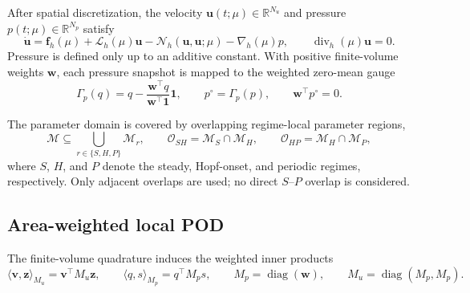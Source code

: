 \documentclass{article}
\begin{document}
After spatial discretization, the velocity
$\bm u(t;\mu)\in\mathbb R^{N_u}$ and pressure
$p(t;\mu)\in\mathbb R^{N_p}$ satisfy
\begin{equation}
    \dot{\bm u}
    =
    \bm f_h(\mu)
    +\mathcal L_h(\mu)\bm u
    -\mathcal N_h(\bm u,\bm u;\mu)
    -\nabla_h(\mu)p,
    \qquad
    \operatorname{div}_h(\mu)\bm u=0.
    \label{eq:app_fom}
\end{equation}
Pressure is defined only up to an additive constant.
With positive finite-volume weights $\bm w$, each pressure snapshot is mapped
to the weighted zero-mean gauge
\begin{equation}
    \Gamma_p(q)
    =
    q-\frac{\bm w^\top q}{\bm w^\top\bm 1}\bm 1,
    \qquad
    p^\circ=\Gamma_p(p),
    \qquad
    \bm w^\top p^\circ=0.
    \label{eq:app_pressure_gauge}
\end{equation}

The parameter domain is covered by overlapping regime-local parameter regions,
\begin{equation}
    \mathcal M
    \subseteq
    \bigcup_{r\in\{S,H,P\}}\mathcal M_r,
    \qquad
    \mathcal O_{SH}
    =
    \mathcal M_S\cap\mathcal M_H,
    \qquad
    \mathcal O_{HP}
    =
    \mathcal M_H\cap\mathcal M_P,
    \label{eq:app_regime_cover}
\end{equation}
where $S$, $H$, and $P$ denote the steady, Hopf-onset, and periodic
regimes, respectively.
Only adjacent overlaps are used; no direct $S$--$P$ overlap is considered.


\subsection{Area-weighted local POD}

The finite-volume quadrature induces the weighted inner products
\begin{equation}
    \langle\bm v,\bm z\rangle_{M_u}
    =
    \bm v^\top M_u\bm z,
    \qquad
    \langle q,s\rangle_{M_p}
    =
    q^\top M_p s,
    \qquad
    M_p=\operatorname{diag}(\bm w),
    \qquad
    M_u=\operatorname{diag}(M_p,M_p).
    \label{eq:app_weighted_inner_products}
\end{equation}
\end{document}
